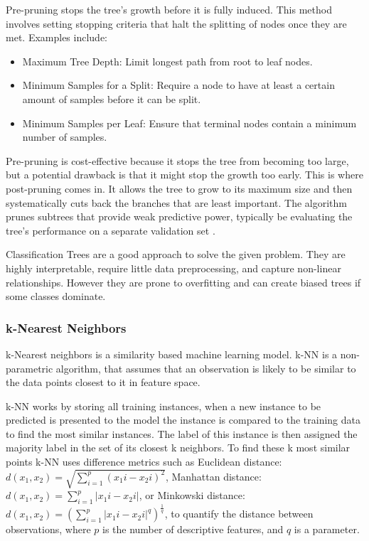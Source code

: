 \documentclass[conference]{IEEEtran}
\begin{document}
Pre-pruning stops the tree's growth before it is fully induced. This method involves setting stopping criteria that halt the splitting of nodes once they are met. Examples include:

\begin{itemize}
    \item Maximum Tree Depth: Limit longest path from root to leaf nodes.
    \item Minimum Samples for a Split: Require a node to have at least a certain amount of samples before it can be split.
    \item Minimum Samples per Leaf: Ensure that terminal nodes contain a minimum number of samples.
\end{itemize}

Pre-pruning is cost-effective because it stops the tree from becoming too large, but a potential drawback is that it might stop the growth too early. This is where post-pruning comes in. It allows the tree to grow to its maximum size and then systematically cuts back the branches that are least important. The algorithm prunes subtrees that provide weak predictive power, typically be evaluating the tree's performance on a separate validation set \cite{b1}.

Classification Trees are a good approach to solve the given problem. They are highly interpretable, require little data preprocessing, and capture non-linear relationships. However they are prone to overfitting and can create biased trees if some classes dominate.

\subsubsection{\textbf{k-Nearest Neighbors}}

k-Nearest neighbors is a similarity based machine learning model. k-NN is a non-parametric algorithm, that assumes that an observation is likely to be similar to the data points closest to it in feature space.

k-NN works by storing all training instances, when a new instance to be predicted is presented to the model the instance is compared to the training data to find the most similar instances. The label of this instance is then assigned the majority label in the set of its closest k neighbors. To find these k most similar points k-NN uses difference metrics such as Euclidean distance: $d(x_1, x_2) = \sqrt{\sum_{i=1}^{p} (x_1i - x_2i)^2}$, Manhattan distance: $d(x_1, x_2) = \sum_{i=1}^{p} |x_1i - x_2i|$, or Minkowski distance: $d(x_1, x_2) = (\sum_{i=1}^{p} |x_1i - x_2i|^q)^\frac{1}{q}$, to quantify the distance between observations, where $p$ is the number of descriptive features, and $q$ is a parameter.
\end{document}
